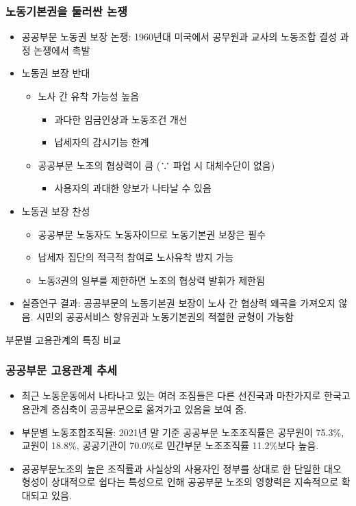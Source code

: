 \documentclass[aspectratio=169,xcolor=dvipsnames,handout]{beamer}
\begin{document}
\begin{frame}[allowframebreaks]
    \frametitle{노동기본권을 둘러싼 논쟁}
    \begin{itemize}[<+->]
        \item 공공부문 노동권 보장 논쟁: 1960년대 미국에서 공무원과 교사의 노동조합 결성 과정 논쟁에서 촉발
        \item 노동권 보장 반대 
        \begin{itemize}
            \item 노사 간 유착 가능성 높음
            \begin{itemize}
                \item 과다한 임금인상과 노동조건 개선
                \item 납세자의 감시기능 한계 
            \end{itemize}
            \item 공공부문 노조의 협상력이 큼 (∵ 파업 시 대체수단이 없음)
            \begin{itemize}
                \item 사용자의 과대한 양보가 나타날 수 있음
            \end{itemize}
        \end{itemize}
        \framebreak%
        \item 노동권 보장 찬성 
        \begin{itemize}
            \item 공공부문 노동자도 노동자이므로 노동기본권 보장은 필수
            \item 납세자 집단의 적극적 참여로 노사유착 방지 가능
            \item 노동3권의 일부를 제한하면 노조의 협상력 발휘가 제한됨
        \end{itemize}
        \item 실증연구 결과: 공공부문의 노동기본권 보장이 노사 간 협상력 왜곡을 가져오지 않음. 시민의 공공서비스 향유권과 노동기본권의 적절한 균형이 가능함 
    \end{itemize}
    \begin{table}
        \centering
        \resizebox{.7\textwidth}{!}{\relax
            
        }
        \caption{부문별 고용관계의 특징 비교}
    \end{table}
\end{frame}

\begin{frame}[allowframebreaks]
    \frametitle{공공부문 고용관계 추세}
    \begin{itemize}[<+->]
        \item 최근 노동운동에서 나타나고 있는 여러 조짐들은 다른 선진국과 마찬가지로 한국고용관계 중심축이 공공부문으로 옮겨가고 있음을 보여 줌.
        \item 부문별 노동조합조직율:  2021년 말 기준 공공부문 노조조직률은 공무원이 75.3\%, 교원이 18.8\%, 공공기관이 70.0\%로 민간부문 노조조직률 11.2\%보다 높음.
        \item 공공부문노조의 높은 조직률과 사실상의 사용자인 정부를 상대로 한 단일한 대오 형성이 상대적으로 쉽다는 특성으로 인해 공공부문 노조의 영향력은 지속적으로 확대되고 있음. 
    \end{itemize}
\end{frame}
\end{document}
